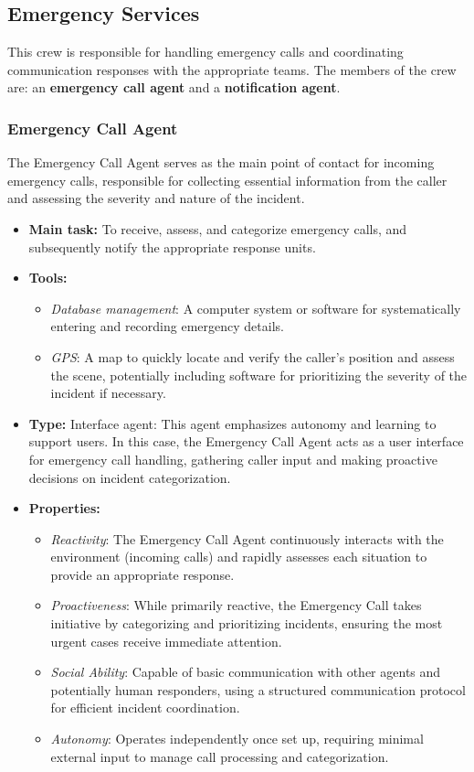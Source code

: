 \subsection{Emergency Services}

This crew is responsible for handling emergency calls and coordinating communication responses with the appropriate teams. The members of the crew are: an \textbf{emergency call agent} and a \textbf{notification agent}.

\subsubsection{Emergency Call Agent}

The Emergency Call Agent serves as the main point of contact for incoming emergency calls, responsible for collecting essential information from the caller and assessing the severity and nature of the incident.

\begin{itemize}
    \item \textbf{Main task:} To receive, assess, and categorize emergency calls, and subsequently notify the appropriate response units.
    \item \textbf{Tools:} 
    \begin{itemize}
        \item \emph{Database management}: A computer system or software for systematically entering and recording emergency details.
        \item \emph{GPS}: A map to quickly locate and verify the caller's position and assess the scene, potentially including software for prioritizing the severity of the incident if necessary.
    \end{itemize}
    \item \textbf{Type:} Interface agent: This agent emphasizes autonomy and learning to support users. In this case, the Emergency Call Agent acts as a user interface for emergency call handling, gathering caller input and making proactive decisions on incident categorization.
    \item \textbf{Properties:}
    \begin{itemize}
        \item \emph{Reactivity}:  The Emergency Call Agent continuously interacts with the environment (incoming calls) and rapidly assesses each situation to provide an appropriate response.
        \item \emph{Proactiveness}: While primarily reactive, the Emergency Call takes initiative by categorizing and prioritizing incidents, ensuring the most urgent cases receive immediate attention.
        \item \emph{Social Ability}: Capable of basic communication with other agents and potentially human responders, using a structured communication protocol for efficient incident coordination.
        \item \emph{Autonomy}: Operates independently once set up, requiring minimal external input to manage call processing and categorization.
    \end{itemize}
\end{itemize}

